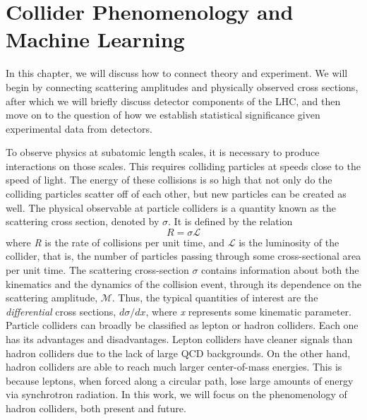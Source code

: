 \chapter{Collider Phenomenology and Machine Learning}\label{ch:ColliderPheno}
In this chapter, we will discuss how to connect theory and experiment. We will begin by connecting scattering amplitudes and physically observed cross sections, after which we will briefly discuss detector components of the LHC, and then move on to the question of how we establish statistical significance given experimental data from detectors.

To observe physics at subatomic length scales, it is necessary to produce interactions on those scales. This requires colliding particles at speeds close to the speed of light. The energy of these collisions is so high that not only do the colliding particles scatter off of each other, but new particles can be created as well. 
The physical observable at particle colliders is a quantity known as the scattering cross section, denoted by $\sigma$. It is defined by the relation
\[R = \sigma\mathcal{L}\]
where \emph{R} is the rate of collisions per unit time, and $\mathcal{L}$ is the luminosity of the collider, that is, the number of particles passing through some cross-sectional area per unit time. The scattering cross-section $\sigma$ contains information about both the kinematics and the dynamics of the collision event, through its dependence on the scattering amplitude, $\mathcal{M}$. Thus, the typical quantities of interest are the \emph{differential} cross sections, $d\sigma/dx$, where \emph{x} represents some kinematic parameter. 
Particle colliders can broadly be classified as lepton or hadron colliders. Each one has its advantages and disadvantages. Lepton colliders have cleaner signals than hadron colliders due to the lack of large QCD backgrounds. On the other hand, hadron colliders are able to reach much larger center-of-mass energies. This is because leptons, when forced along a circular path, lose large amounts of energy via synchrotron radiation. In this work, we will focus on the phenomenology of hadron colliders, both present and future.

